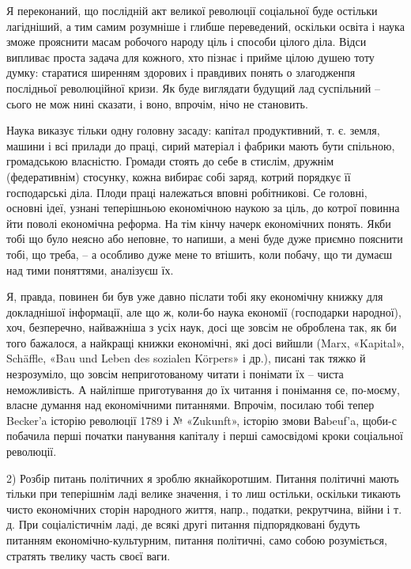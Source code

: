 Я переконаний, що послідній акт великої революції соціальної буде остільки
лагідніший, а тим самим розумніше і глибше переведений, оскільки освіта і наука
зможе прояснити масам робочого народу ціль і способи цілого діла. Відси
випливає проста задача для кожного, хто пізнає і прийме цілою душею тоту думку:
старатися ширенням здорових і правдивих понять о злагодженпя послідньої
революційної кризи. Як буде виглядати будущий лад суспільний – сього не мож
нині сказати, і воно, впрочім, нічо не становить.

Наука виказує тільки одну головну засаду: капітал продуктивний, т. є. земля,
машини і всі прилади до праці, сирий матеріал і фабрики мають бути спільною,
громадською власністю. Громади стоять до себе в стислім, дружнім (федеративнім)
стосунку, кожна вибирає собі заряд, котрий порядкує її господарські діла. Плоди
праці належаться вповні робітникові. Се головні, основні ідеї, узнані
теперішньою економічною наукою за ціль, до котрої повинна йти поволі економічна
реформа. На тім кінчу начерк економічних понять. Якби тобі що було неясно або
неповне, то напиши, а мені буде дуже приємно пояснити тобі, що треба, – а
особливо дуже мене то втішить, коли побачу, що ти думаєш над тими поняттями,
аналізуєш їх.

Я, правда, повинен би був уже давно післати тобі яку економічну книжку для
докладнішої інформації, але що ж, коли-бо наука економії (господарки народної),
хоч, безперечно, найважніша з усіх наук, досі ще зовсім не оброблена так, як би
того бажалося, а найкращі книжки економічні, які досі вийшли (Marx, «Kapital»,
Schäffle, «Bau und Leben des sozialen Körpers» і др.), писані так тяжко й
незрозуміло, що зовсім неприготованому читати і понімати їх – чиста
неможливість. А найліпше приготування до їх читання і понімання се, по-моєму,
власне думання над економічними питаннями. Впрочім, посилаю тобі тепер Becker’a
історію революції 1789 і № «Zukunft», історію змови Ваbeuf’a, щоби-с побачила
перші початки панування капіталу і перші самосвідомі кроки соціальної
революції.

2) Розбір питань політичних я зроблю якнайкоротшим. Питання політичні мають
тільки при теперішнім ладі велике значення, і то лиш остільки, оскільки тикають
чисто економічних сторін народного життя, напр., податки, рекрутчина, війни і
т. д. При соціалістичнім ладі, де всякі другі питання підпорядковані будуть
питанням економічно-культурним, питання політичні, само собою розуміється,
стратять твелику часть своєї ваги.

